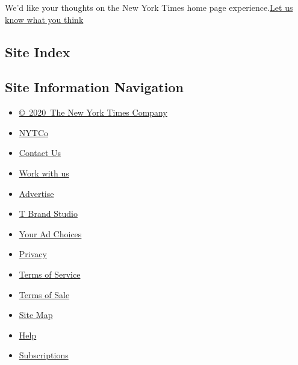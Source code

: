We'd like your thoughts on the New York Times home page
experience.\href{http://nyt.qualtrics.com/jfe/form/SV_eFJmKj9v0krSE0l}{Let
us know what you think}

\hypertarget{site-index}{%
\subsection{Site Index}\label{site-index}}

\hypertarget{site-information-navigation}{%
\subsection{Site Information
Navigation}\label{site-information-navigation}}

\begin{itemize}
\tightlist
\item
  \href{https://help.nytimes.com/hc/en-us/articles/115014792127-Copyright-notice}{©~2020~The
  New York Times Company}
\end{itemize}

\begin{itemize}
\tightlist
\item
  \href{https://www.nytco.com/}{NYTCo}
\item
  \href{https://help.nytimes.com/hc/en-us/articles/115015385887-Contact-Us}{Contact
  Us}
\item
  \href{https://www.nytco.com/careers/}{Work with us}
\item
  \href{https://nytmediakit.com/}{Advertise}
\item
  \href{http://www.tbrandstudio.com/}{T Brand Studio}
\item
  \href{https://www.nytimes.com/privacy/cookie-policy\#how-do-i-manage-trackers}{Your
  Ad Choices}
\item
  \href{https://www.nytimes.com/privacy}{Privacy}
\item
  \href{https://help.nytimes.com/hc/en-us/articles/115014893428-Terms-of-service}{Terms
  of Service}
\item
  \href{https://help.nytimes.com/hc/en-us/articles/115014893968-Terms-of-sale}{Terms
  of Sale}
\item
  \href{https://spiderbites.nytimes.com}{Site Map}
\item
  \href{https://help.nytimes.com/hc/en-us}{Help}
\item
  \href{https://www.nytimes.com/subscription?campaignId=37WXW}{Subscriptions}
\end{itemize}
